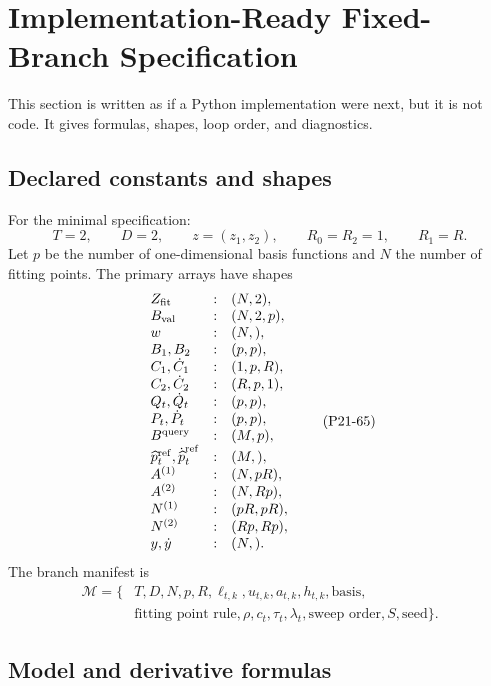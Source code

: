 \documentclass[11pt]{article}
\begin{document}
\section{Implementation-Ready Fixed-Branch Specification}

This section is written as if a Python implementation were next, but it is not
code.  It gives formulas, shapes, loop order, and diagnostics.

\subsection{Declared constants and shapes}

For the minimal specification:
\[
    T=2,\qquad D=2,\qquad z=(z_1,z_2),\qquad
    R_0=R_2=1,\qquad R_1=R.
    \tag{P21-64}
\]
Let \(p\) be the number of one-dimensional basis functions and \(N\) the number
of fitting points.  The primary arrays have shapes
\[
\begin{array}{lll}
Z_{\rm fit} &:& (N,2),\\
B_{\rm val} &:& (N,2,p),\\
w &:& (N,),\\
B_1,B_2 &:& (p,p),\\
C_1,\dot C_1 &:& (1,p,R),\\
C_2,\dot C_2 &:& (R,p,1),\\
Q_t,\dot Q_t &:& (p,p),\\
P_t,\dot P_t &:& (p,p),\\
B^{\rm query} &:& (M,p),\\
\widehat p_t^{\rm ref},\dot{\widehat p}_t^{\rm ref} &:& (M,),\\
A^{(1)} &:& (N,pR),\\
A^{(2)} &:& (N,Rp),\\
N^{(1)} &:& (pR,pR),\\
N^{(2)} &:& (Rp,Rp),\\
y,\dot y &:& (N,).
\end{array}
\tag{P21-65}
\]
The branch manifest is
\[
\begin{aligned}
    \mathcal M
    =
    \{&
    T,D,N,p,R,\ell_{t,k},u_{t,k},a_{t,k},h_{t,k},
    \text{basis},\\
    &\text{fitting point rule},\rho,c_t,\tau_t,
    \lambda_t,\text{sweep order},S,\text{seed}\}.
\end{aligned}
\tag{P21-66}
\]

\subsection{Model and derivative formulas}
\end{document}
